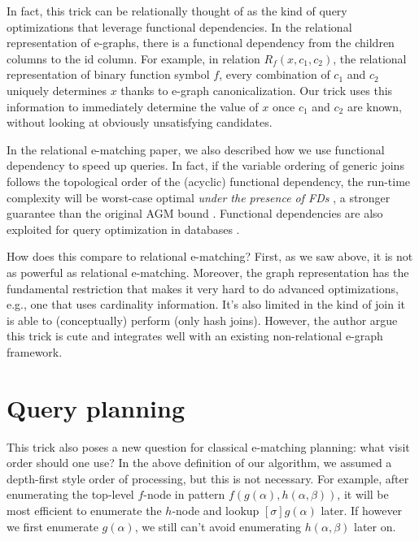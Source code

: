 In fact, this trick can be relationally thought of as the kind of query
 optimizations that leverage functional dependencies.
In the relational representation of e-graphs,
 there is a functional dependency from the
 children columns to the id column.
For example, in relation
 \(R_f(x, c_1, c_2)\), the relational representation of binary function
 symbol \(f\), every combination of \(c_1\) and \(c_2\) uniquely
 determines \(x\) thanks to e-graph canonicalization.
Our trick uses this
 information to immediately determine the value of \(x\) once \(c_1\) and
 \(c_2\) are known, without looking at obviously unsatisfying candidates.

In the relational e-matching paper,
 we also described how we use
 functional dependency to speed up queries.
In fact, if the variable
 ordering of generic joins follows the topological order of the (acyclic)
 functional dependency,
 the run-time complexity will be worst-case
 optimal \textit{under the presence of FDs} \citep{wcoj-survey}, 
 a stronger guarantee than the original
 AGM bound \citep{agm}.
Functional dependencies are also exploited
 for query optimization in databases \citep{data-dep-for-opt-survey}.

How does this compare to relational e-matching? 
First, as we saw above,
 it is not as powerful as relational e-matching.
Moreover, 
 the graph representation has the fundamental restriction 
 that makes it very hard
 to do advanced optimizations, 
 e.g., one that uses cardinality information.
It's also limited in the kind of join it is able to
 (conceptually) perform (only hash joins).
However, 
 the author argue this trick is
 cute and integrates well
 with an existing non-relational e-graph framework.

\section{Query planning}\label{query-planning}

This trick also poses a new question for classical e-matching planning:
what visit order should one use? In the above definition of our algorithm,
 we assumed a depth-first style order of processing, but this is not
 necessary.
For example,
 after enumerating the top-level \(f\)-node in
 pattern \(f(g(\alpha), h(\alpha, \beta))\), it will be most efficient to
 enumerate the \(h\)-node and lookup \([\sigma]g(\alpha)\) later.
If however we first enumerate \(g(\alpha)\),
we still can't avoid enumerating \(h(\alpha,\beta)\) later on.

